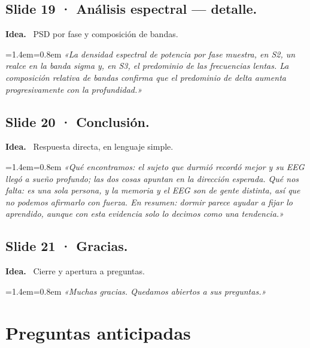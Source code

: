 \documentclass[11pt,a4paper]{article}
\newenvironment{guion}%
{\par\smallskip\begingroup\leftskip=1.4em\rightskip=0.8em\color{ink}\itshape}%
{\par\endgroup\smallskip}
\newcommand{\lab}[1]{\textbf{\color{ink}#1}\ }
\begin{document}
\subsection{Slide 19 · Análisis espectral — detalle.}
\lab{Idea.} PSD por fase y composición de bandas.
\begin{guion}
«La densidad espectral de potencia por fase muestra, en S2, un realce en la banda sigma y, en S3, el
predominio de las frecuencias lentas. La composición relativa de bandas confirma que el predominio de
delta aumenta progresivamente con la profundidad.»
\end{guion}

\subsection{Slide 20 · Conclusión.}
\lab{Idea.} Respuesta directa, en lenguaje simple.
\begin{guion}
«Qué encontramos: el sujeto que durmió recordó mejor y su EEG llegó a sueño profundo; las dos cosas
apuntan en la dirección esperada. Qué nos falta: es una sola persona, y la memoria y el EEG son de gente
distinta, así que no podemos afirmarlo con fuerza. En resumen: dormir parece ayudar a fijar lo aprendido,
aunque con esta evidencia solo lo decimos como una tendencia.»
\end{guion}

\subsection{Slide 21 · Gracias.}
\lab{Idea.} Cierre y apertura a preguntas.
\begin{guion}
«Muchas gracias. Quedamos abiertos a sus preguntas.»
\end{guion}

\section{Preguntas anticipadas}
\end{document}
